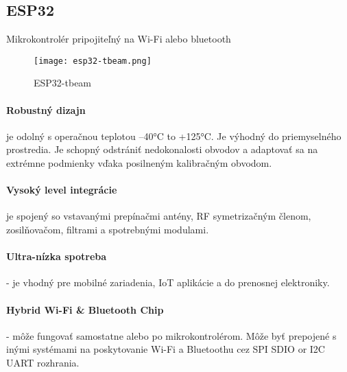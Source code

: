 

\subsection{ESP32}
   Mikrokontrolér  pripojiteľný na Wi-Fi alebo bluetooth
   
\begin{wrapfigure}[8]{r}[-9mm]{0.45\textwidth }
    \centering
  \texttt{[image: esp32-tbeam.png]}
  \caption{ESP32-tbeam}
\end{wrapfigure}

            \paragraph{Robustný dizajn} je odolný s operačnou teplotou –40°C to +125°C. Je výhodný do priemyselného prostredia. Je schopný odstrániť nedokonalosti obvodov a adaptovať sa na extrémne podmienky vďaka posilneným kalibračným obvodom.
            \paragraph{Vysoký level integrácie} je spojený so vstavanými prepínačmi antény, RF symetrizačným členom, zosilňovačom, filtrami a spotrebnými modulami.
            \paragraph{Ultra-nízka spotreba} - je vhodný pre mobilné zariadenia, IoT aplikácie a do prenosnej elektroniky.
            \paragraph{Hybrid Wi-Fi \& Bluetooth Chip} - môže fungovať samostatne alebo po mikrokontrolérom. Môže byť prepojené s inými systémami na poskytovanie Wi-Fi a Bluetoothu cez SPI \/ SDIO or I2C \/ UART rozhrania.
    

% 

